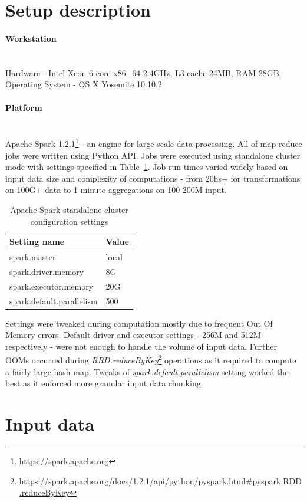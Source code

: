 \documentclass[]{final_report}
\newcommand{\myparagraph}[1]{\paragraph{#1}\mbox{}\\}
\begin{document}
\section{Setup description}

\myparagraph{Workstation}
Hardware - Intel Xeon 6-core x86\_64 2.4GHz, L3 cache 24MB, RAM 28GB. \\
Operating System - OS X Yosemite 10.10.2

\myparagraph{Platform}
Apache Spark 1.2.1\footnote{\url{https://spark.apache.org}} - an engine for large-scale data processing. All of map reduce jobs were written using Python API. Jobs were executed using standalone cluster mode with settings specified in Table~\ref{tab:spark_conf}. Job run times varied widely based on input data size and complexity of computations - from 20hs+ for transformations on 100G+ data to 1 minute aggregations on 100-200M input.

\begin{table}[h]
\begin{center}
    \begin{tabular}{| l | l |}
    \hline
    \textbf{Setting name} & \textbf{Value} \\
    \hline
    spark.master & local \\
    \hline
    spark.driver.memory & 8G \\
    \hline
    spark.executor.memory & 20G \\
    \hline
    spark.default.parallelism & 500 \\
    \hline
    \end{tabular}
\end{center}
\caption{Apache Spark standalone cluster configuration settings} 
\label{tab:spark_conf}
\end{table}

Settings were tweaked during computation mostly due to frequent Out Of Memory errors. Default driver and executor settings - 256M and 512M respectively - were not enough to handle the volume of input data. Further OOMs occurred during \textit{RRD.reduceByKey}\footnote{\url{https://spark.apache.org/docs/1.2.1/api/python/pyspark.html#pyspark.RDD.reduceByKey}} operations as it required to compute a fairly large hash map. Tweaks of \textit{spark.default.parallelism} setting worked the best as it enforced more granular input data chunking.

\section{Input data}
\end{document}
